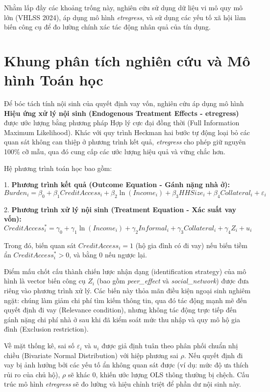 \documentclass[12pt,a4paper]{report}
\begin{document}
Nhằm lấp đầy các khoảng trống này, nghiên cứu sử dụng dữ liệu vi mô quy mô lớn (VHLSS 2024), áp dụng mô hình \textit{etregress}, và sử dụng các yếu tố xã hội làm biến công cụ để đo lường chính xác tác động nhân quả của tín dụng.


\section{Khung phân tích nghiên cứu và Mô hình Toán học}

Để bóc tách tính nội sinh của quyết định vay vốn, nghiên cứu áp dụng mô hình \textbf{Hiệu ứng xử lý nội sinh (Endogenous Treatment Effects - etregress)} được ước lượng bằng phương pháp Hợp lý cực đại đồng thời (Full Information Maximum Likelihood). Khác với quy trình Heckman hai bước tự động loại bỏ các quan sát không can thiệp ở phương trình kết quả, \textit{etregress} cho phép giữ nguyên 100\% cỡ mẫu, qua đó cung cấp các ước lượng hiệu quả và vững chắc hơn.



Hệ phương trình toán học bao gồm:

1. \textbf{Phương trình kết quả (Outcome Equation - Gánh nặng nhà ở):}
$$ Burden_i = \beta_0 + \beta_1 CreditAccess_i + \beta_2 \ln(Income_i) + \beta_3 HHSize_i + \beta_4 Collateral_i + \varepsilon_i $$

2. \textbf{Phương trình xử lý nội sinh (Treatment Equation - Xác suất vay vốn):}
$$ CreditAccess_i^* = \gamma_0 + \gamma_1 \ln(Income_i) + \gamma_2 Informal_i + \gamma_3 Collateral_i + \gamma_4 Z_i + u_i $$

Trong đó, biến quan sát $CreditAccess_i = 1$ (hộ gia đình có đi vay) nếu biến tiềm ẩn $CreditAccess_i^* > 0$, và bằng $0$ nếu ngược lại. 

Điểm mấu chốt cấu thành chiến lược nhận dạng (identification strategy) của mô hình là vector biến công cụ $Z_i$ (bao gồm \textit{peer\_effect} và \textit{social\_network}) được đưa riêng vào phương trình xử lý. Các biến này thỏa mãn điều kiện ngoại sinh nghiêm ngặt: chúng làm giảm chi phí tìm kiếm thông tin, qua đó tác động mạnh mẽ đến quyết định đi vay (Relevance condition), nhưng không tác động trực tiếp đến gánh nặng chi phí nhà ở sau khi đã kiểm soát mức thu nhập và quy mô hộ gia đình (Exclusion restriction).

Về mặt thống kê, sai số $\varepsilon_i$ và $u_i$ được giả định tuân theo phân phối chuẩn nhị chiều (Bivariate Normal Distribution) với hiệp phương sai $\rho$. Nếu quyết định đi vay bị ảnh hưởng bởi các yếu tố ẩn không quan sát được (ví dụ: mức độ ưa thích rủi ro của chủ hộ), $\rho$ sẽ khác $0$, khiến ước lượng OLS thông thường bị chệch. Cấu trúc mô hình \textit{etregress} sẽ đo lường và hiệu chỉnh triệt để phần dư nội sinh này.
		
\end{document}

